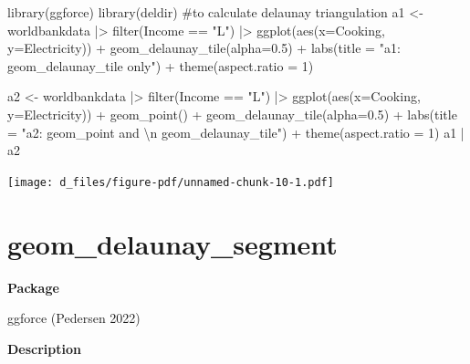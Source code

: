 \documentclass[
  letterpaper,
  DIV=11,
  numbers=noendperiod]{scrreprt}
\newenvironment{Shaded}{\begin{snugshade}}{\end{snugshade}}
\newcommand{\AttributeTok}[1]{\textcolor[rgb]{0.40,0.45,0.13}{#1}}
\newcommand{\CommentTok}[1]{\textcolor[rgb]{0.37,0.37,0.37}{#1}}
\newcommand{\DecValTok}[1]{\textcolor[rgb]{0.68,0.00,0.00}{#1}}
\newcommand{\FloatTok}[1]{\textcolor[rgb]{0.68,0.00,0.00}{#1}}
\newcommand{\FunctionTok}[1]{\textcolor[rgb]{0.28,0.35,0.67}{#1}}
\newcommand{\NormalTok}[1]{\textcolor[rgb]{0.00,0.23,0.31}{#1}}
\newcommand{\OtherTok}[1]{\textcolor[rgb]{0.00,0.23,0.31}{#1}}
\newcommand{\SpecialCharTok}[1]{\textcolor[rgb]{0.37,0.37,0.37}{#1}}
\newcommand{\StringTok}[1]{\textcolor[rgb]{0.13,0.47,0.30}{#1}}
\begin{document}
\begin{Shaded}
\begin{Highlighting}[]
\FunctionTok{library}\NormalTok{(ggforce)}
\FunctionTok{library}\NormalTok{(deldir) }\CommentTok{\#to calculate delaunay triangulation}
\NormalTok{a1 }\OtherTok{\textless{}{-}}\NormalTok{ worldbankdata }\SpecialCharTok{|\textgreater{}}
  \FunctionTok{filter}\NormalTok{(Income }\SpecialCharTok{==} \StringTok{"L"}\NormalTok{) }\SpecialCharTok{|\textgreater{}}
  \FunctionTok{ggplot}\NormalTok{(}\FunctionTok{aes}\NormalTok{(}\AttributeTok{x=}\NormalTok{Cooking, }\AttributeTok{y=}\NormalTok{Electricity)) }\SpecialCharTok{+}   
  \FunctionTok{geom\_delaunay\_tile}\NormalTok{(}\AttributeTok{alpha=}\FloatTok{0.5}\NormalTok{) }\SpecialCharTok{+} 
  \FunctionTok{labs}\NormalTok{(}\AttributeTok{title =} \StringTok{"a1: geom\_delaunay\_tile only"}\NormalTok{) }\SpecialCharTok{+}
  \FunctionTok{theme}\NormalTok{(}\AttributeTok{aspect.ratio =} \DecValTok{1}\NormalTok{)}

\NormalTok{a2 }\OtherTok{\textless{}{-}}\NormalTok{ worldbankdata }\SpecialCharTok{|\textgreater{}}
  \FunctionTok{filter}\NormalTok{(Income }\SpecialCharTok{==} \StringTok{"L"}\NormalTok{) }\SpecialCharTok{|\textgreater{}}
  \FunctionTok{ggplot}\NormalTok{(}\FunctionTok{aes}\NormalTok{(}\AttributeTok{x=}\NormalTok{Cooking, }\AttributeTok{y=}\NormalTok{Electricity)) }\SpecialCharTok{+}   
  \FunctionTok{geom\_point}\NormalTok{() }\SpecialCharTok{+}
  \FunctionTok{geom\_delaunay\_tile}\NormalTok{(}\AttributeTok{alpha=}\FloatTok{0.5}\NormalTok{) }\SpecialCharTok{+} 
  \FunctionTok{labs}\NormalTok{(}\AttributeTok{title =} \StringTok{"a2: geom\_point and }\SpecialCharTok{\textbackslash{}n}\StringTok{ geom\_delaunay\_tile"}\NormalTok{) }\SpecialCharTok{+}
  \FunctionTok{theme}\NormalTok{(}\AttributeTok{aspect.ratio =} \DecValTok{1}\NormalTok{)}
\NormalTok{a1 }\SpecialCharTok{|}\NormalTok{ a2}
\end{Highlighting}
\end{Shaded}

\texttt{[image: d\_files/figure-pdf/unnamed-chunk-10-1.pdf]}

\section{geom\_delaunay\_segment}\label{delaunay_segment}

\textbf{Package}

ggforce (Pedersen 2022)

\textbf{Description}
\end{document}
